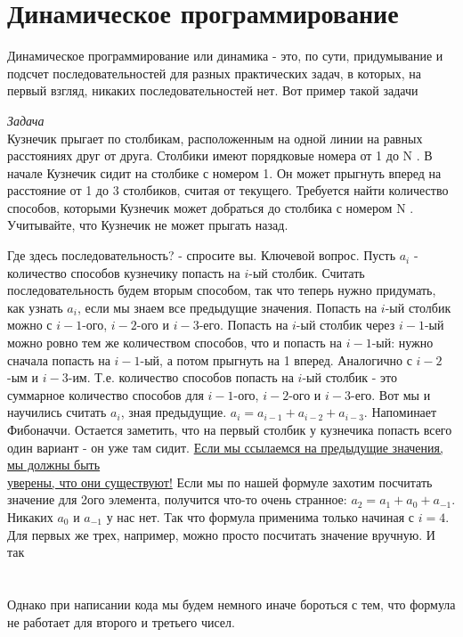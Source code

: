 \documentclass[12pt]{article} %
\begin{document}
\section{Динамическое программирование}
Динамическое программирование или динамика - это, по сути, придумывание и подсчет последовательностей для разных практических задач, в которых, на первый взгляд, никаких последовательностей нет. Вот пример такой задачи
\begin{tcolorbox}[colback=white, colframe=black]
	\textit{Задача}\\
	Кузнечик прыгает по столбикам, расположенным на одной линии на равных расстояниях друг от друга. Столбики имеют порядковые номера от 1 до N . В начале Кузнечик сидит на столбике с номером 1. Он может прыгнуть вперед на расстояние от 1 до 3 столбиков, считая от текущего. Требуется найти количество способов, которыми Кузнечик может добраться до столбика с номером N . Учитывайте, что Кузнечик не может прыгать назад. 
\end{tcolorbox}
Где здесь последовательность? - спросите вы. Ключевой вопрос. Пусть $a_i$ - количество способов кузнечику попасть на $i$-ый столбик. Считать последовательность будем вторым способом, так что теперь нужно придумать, как узнать $a_i$, если мы знаем все предыдущие значения. Попасть на $i$-ый столбик можно с $i-1$-ого, $i-2$-ого и $i-3$-его. Попасть на $i$-ый столбик через $i-1$-ый можно ровно тем же количеством способов, что и попасть на $i-1$-ый: нужно сначала попасть на $i-1$-ый, а потом прыгнуть на 1 вперед. Аналогично с $i-2$-ым и $i-3$-им. Т.е. количество способов попасть на $i$-ый столбик - это суммарное количество способов для $i-1$-ого, $i-2$-ого и $i-3$-его. Вот мы и научились считать $a_i$, зная предыдущие. $a_i = a_{i - 1} + a_{i - 2} + a_{i - 3}$. Напоминает Фибоначчи. Остается заметить, что на первый столбик у кузнечика попасть всего один вариант - он уже там сидит. \underline{Если мы ссылаемся на предыдущие значения, мы должны быть}\\ \underline{уверены, что они существуют!} Если мы по нашей формуле захотим посчитать значение для 2ого элемента, получится что-то очень странное: $a_2 = a_1 + a_0 + a_{-1}$. Никаких $a_0$ и $a_{-1}$ у нас нет. Так что формула применима только начиная с $i = 4$. Для первых же трех, например, можно просто посчитать значение вручную. И так\\
\\
\\
Однако при написании кода мы будем немного иначе бороться с тем, что формула не работает для второго и третьего чисел.
\end{document}
